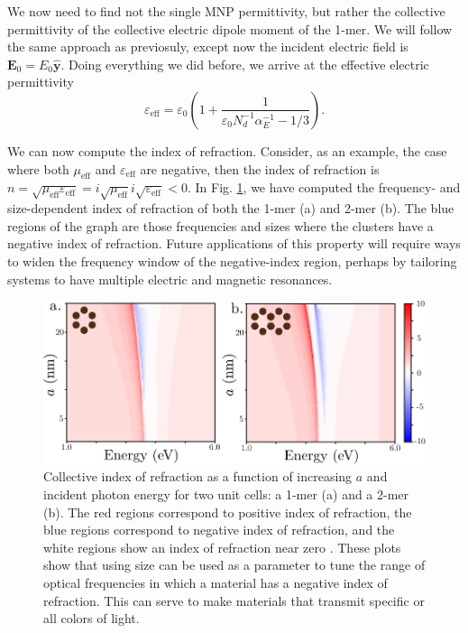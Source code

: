 \documentclass [11pt, proquest] {uwthesis}[2016/11/22]
\begin{document}
We now need to find not the single MNP permittivity, but rather the collective permittivity of the collective electric dipole moment of the 1-mer. We will follow the same approach as previosuly, except now the incident electric field is $\textbf{E}_0 = E_0\hat{\textbf{y}}$. Doing everything we did before, we arrive at the effective electric permittivity
\begin{equation}
\varepsilon_{\textrm{eff}} = \varepsilon_0\left(1+\frac{1}{\varepsilon_0N_d^{-1}\alpha_E^{-1}-1/3}\right).
\label{eps_eff}
\end{equation}

We can now compute the index of refraction. Consider, as an example, the case where both $\mu_{\textrm{eff}}$ and $\varepsilon_{\textrm{eff}}$ are negative, then the index of refraction is $n = \sqrt{\mu_{\textrm{eff}}\varepsilon_{\textrm{eff}}} = i\sqrt{\mu_{\textrm{eff}}}i\sqrt{\varepsilon_{\textrm{eff}}} < 0$. In Fig. \ref{n_plot}, we have computed the frequency- and size-dependent index of refraction of both the 1-mer (a) and 2-mer (b). The blue regions of the graph are those frequencies and sizes where the clusters have a negative index of refraction. Future applications of this property will require ways to widen the frequency window of the negative-index region, perhaps by tailoring systems to have multiple electric and magnetic resonances.


\begin{figure}
\begin{centering}
\includegraphics{contour_n_plot.pdf}
\caption{Collective index of refraction as a function of increasing $a$ and incident photon energy for two unit cells: a 1-mer (a) and a 2-mer (b). The red regions correspond to positive index of refraction, the blue regions correspond to negative index of refraction, and the white regions show an index of refraction near zero \cite{enz}. These plots show that using size can be used as a parameter to tune the range of optical frequencies in which a material has a negative index of refraction. This can serve to make materials that transmit specific or all colors of light.}
\label{n_plot}
\end{centering}
\end{figure}

%
%


%
\end{document}
